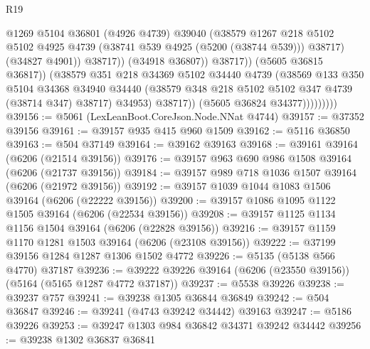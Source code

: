 \begin{lexlean}{R19}
\begin{coremodule}
{{{{{{{{{{{                                    @1269
                                    @5104
                                    @36801
                                    (@4926 @4739)
                                    @39040
                                    (@38579
                                      @1267
                                      @218
                                      @5102
                                      @5102
                                      @4925
                                      @4739
                                      (@38741 @539 @4925 (@5200 (@38744 @539)))
                                      @38717)
                                    (@34827 @4901))
                                  @38717))
                              (@34918 @36807))
                            @38717))
                        (@5605 @36815 @36817))
                      (@38579
                        @351
                        @218
                        @34369
                        @5102
                        @34440
                        @4739
                        (@38569
                          @133
                          @350
                          @5104
                          @34368
                          @34940
                          @34440
                          (@38579 @348 @218 @5102 @5102 @347 @4739 (@38714 @347) @38717)
                          @34953)
                        @38717))
                    (@5605 @36824 @34377)))))))))
@39156 := @5061 (LexLeanBoot.CoreJson.Node.NNat @4744)
@39157 := @37352 @39156
@39161 := @39157 @935 @415 @960 @1509
@39162 := @5116 @36850
@39163 := @504 @37149
@39164 := @39162 @39163
@39168 := @39161 @39164 (@6206 (@21514 @39156))
@39176 := @39157 @963 @690 @986 @1508 @39164 (@6206 (@21737 @39156))
@39184 := @39157 @989 @718 @1036 @1507 @39164 (@6206 (@21972 @39156))
@39192 := @39157 @1039 @1044 @1083 @1506 @39164 (@6206 (@22222 @39156))
@39200 := @39157 @1086 @1095 @1122 @1505 @39164 (@6206 (@22534 @39156))
@39208 := @39157 @1125 @1134 @1156 @1504 @39164 (@6206 (@22828 @39156))
@39216 := @39157 @1159 @1170 @1281 @1503 @39164 (@6206 (@23108 @39156))
@39222 := @37199 @39156 @1284 @1287 @1306 @1502 @4772
@39226 := @5135 (@5138 @566 @4770) @37187
@39236 := @39222 @39226 @39164 (@6206 (@23550 @39156)) (@5164 (@5165 @1287 @4772 @37187))
@39237 := @5538 @39226
@39238 := @39237 @757
@39241 := @39238 @1305 @36844 @36849
@39242 := @504 @36847
@39246 := @39241 (@4743 @39242 @34442) @39163
@39247 := @5186 @39226
@39253 := @39247 @1303 @984 @36842 @34371 @39242 @34442
@39256 := @39238 @1302 @36837 @36841
}}}}}}}}}}}
\end{coremodule}
\end{lexlean}
